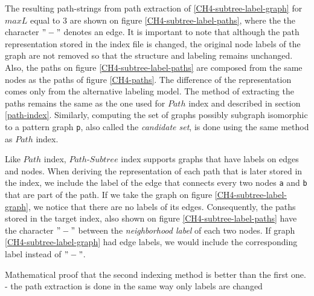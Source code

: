 \documentclass{l4proj}
\theoremstyle{definition}
\begin{document}
The resulting path-strings from path extraction of \ref{CH4-subtree-label-graph} for $maxL$ equal to 3 are shown on figure \ref{CH4-subtree-label-paths}, where the the character $"-"$ denotes an edge. It is important to note that although the path representation stored in the index file is changed, the original node labels of the graph are not removed so that the structure and labeling remains unchanged. Also, the paths on figure \ref{CH4-subtree-label-paths} are composed from the same nodes as the paths of figure \ref{CH4-paths}. The difference of the representation comes only from the alternative labeling model. The method of extracting the paths remains the same as the one used for $Path$ index and described in section \ref{path-index}. Similarly, computing the set of graphs possibly subgraph isomorphic to a pattern graph \texttt{p}, also called the \textit{candidate set}, is done using the same method as $Path$ index.\par
Like $Path$ index, $Path$-$Subtree$ index supports graphs that have labels on edges and nodes. When deriving the representation of each path that is later stored in the index, we include the label of the edge that connects every two nodes \texttt{a} and \texttt{b} that are part of the path. If we take the graph on figure \ref{CH4-subtree-label-graph}, we notice that there are no labels of its edges. Consequently, the paths stored in the target index, also shown on figure \ref{CH4-subtree-label-paths} have the character $"-"$ between the \textit{neighborhood label} of each two nodes. If graph \ref{CH4-subtree-label-graph} had edge labels, we would include the corresponding label instead of $"-"$. \par  
Mathematical proof that the second indexing method is better than the first one. \\


- the path extraction is done in the same way only labels are changed
\end{document}
